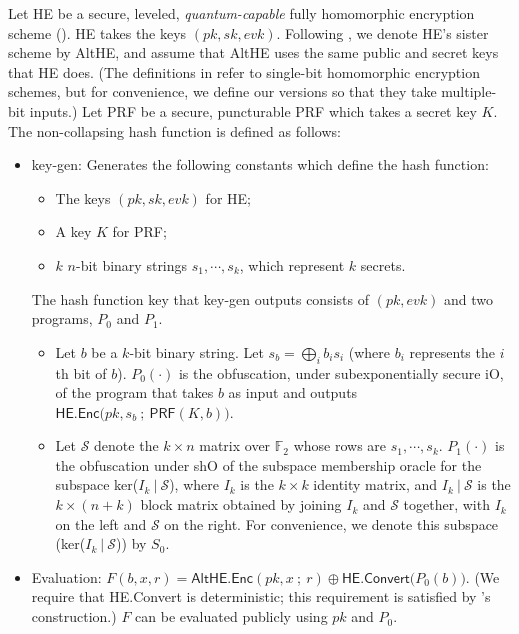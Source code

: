 \documentclass{article}
\begin{document}
Let \textsf{HE} be a secure, leveled, \textit{quantum-capable} fully homomorphic encryption scheme (\cite{mahadev}). \textsf{HE} takes the keys $(pk, sk, evk)$. Following \cite{mahadev}, we denote \textsf{HE}'s sister scheme by \textsf{AltHE}, and assume that \textsf{AltHE} uses the same public and secret keys that \textsf{HE} does. (The definitions in \cite{mahadev} refer to single-bit homomorphic encryption schemes, but for convenience, we define our versions so that they take multiple-bit inputs.) Let \textsf{PRF} be a secure, puncturable PRF which takes a secret key $K$. The non-collapsing hash function is defined as follows:
\begin{itemize}
    \item \textsf{key-gen}: Generates the following constants which define the hash function:
    \begin{itemize}
        \item The keys $(pk, sk, evk)$ for \textsf{HE};
        \item A key $K$ for \textsf{PRF};
        \item $k$ $n$-bit binary strings $s_1, \cdots, s_k$, which represent $k$ secrets.
    \end{itemize}
    The hash function key that \textsf{key-gen} outputs consists of $(pk, evk)$ and two programs, $P_0$ and $P_1$.
    \begin{itemize}
        \item Let $b$ be a $k$-bit binary string. Let $s_b = \bigoplus_i b_i s_i$ (where $b_i$ represents the $i$th bit of $b$). $P_0(\cdot)$ is the obfuscation, under subexponentially secure \textsf{iO}, of the program that takes $b$ as input and outputs $\textsf{HE.Enc}\big( pk, s_b \:;\: \textsf{PRF}(K, b) \big)$.
        \item Let $\mathcal{S}$ denote the $k \times n$ matrix over $\mathbb{F}_2$ whose rows are $s_1, \cdots, s_k$. $P_1(\cdot)$ is the obfuscation under \textsf{shO} of the subspace membership oracle for the subspace ker($I_k \: | \: \mathcal{S}$), where $I_k$ is the $k \times k$ identity matrix, and $I_k \: | \: \mathcal{S}$ is the $k \times (n+k)$ block matrix obtained by joining $I_k$ and $\mathcal{S}$ together, with $I_k$ on the left and $\mathcal{S}$ on the right. For convenience, we denote this subspace (ker($I_k \: | \: \mathcal{S}$)) by $S_0$.
    \end{itemize}
    \item Evaluation: $F(b, x, r) = \textsf{AltHE.Enc}(pk, x \:;\: r) \oplus \textsf{HE.Convert}\big( P_0(b) \big)$. (We require that \textsf{HE.Convert} is deterministic; this requirement is satisfied by \cite{mahadev}'s construction.) $F$ can be evaluated publicly using $pk$ and $P_0$.
\end{itemize}
\end{document}

